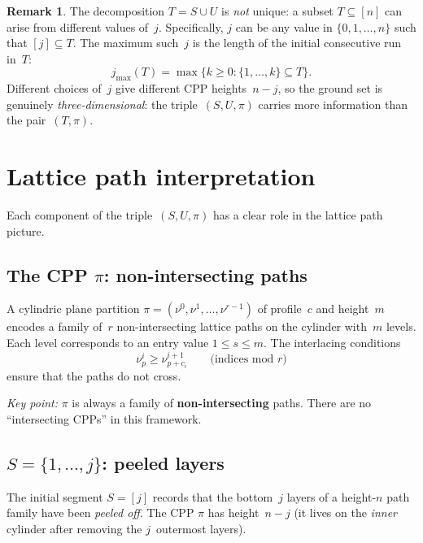 \documentclass[11pt]{article}
\theoremstyle{plain}
\theoremstyle{definition}
\newtheorem{remark}[theorem]{Remark}
\begin{document}
\begin{remark}
The decomposition $T = S \cup U$ is \emph{not} unique: a
subset $T \subseteq [n]$ can arise from different values
of~$j$.  Specifically, $j$ can be any value in
$\{0, 1, \ldots, n\}$ such that $[j] \subseteq T$.  The
maximum such~$j$ is the length of the initial consecutive
run in~$T$:
\[
  j_{\max}(T) = \max\{k \geq 0 : \{1,\ldots,k\} \subseteq T\}.
\]
Different choices of~$j$ give different CPP
heights~$n - j$, so the ground set is genuinely
\emph{three-dimensional}: the triple~$(S, U, \pi)$
carries more information than the pair~$(T, \pi)$.
\end{remark}


\section{Lattice path interpretation}
\label{sec:lattice-paths}

Each component of the triple~$(S, U, \pi)$ has a clear
role in the lattice path picture.

\subsection*{The CPP $\pi$: non-intersecting paths}

A cylindric plane partition $\pi = (\nu^0, \nu^1,
\ldots, \nu^{r-1})$ of profile~$c$ and height~$m$ encodes
a family of~$r$ non-intersecting lattice paths on the
cylinder with~$m$ levels.  Each level corresponds to an
entry value $1 \leq s \leq m$.  The interlacing conditions
\[
  \nu^i_{p} \geq \nu^{i+1}_{p + c_i}
  \qquad \text{(indices mod $r$)}
\]
ensure that the paths do not cross.

\emph{Key point:} $\pi$ is always a family of
\textbf{non-intersecting} paths.  There are no
``intersecting CPPs'' in this framework.

\subsection*{$S = \{1, \ldots, j\}$: peeled layers}

The initial segment $S = [j]$ records that the
bottom~$j$ layers of a height-$n$ path family have been
\emph{peeled off}.  The CPP $\pi$ has height~$n - j$
(it lives on the \emph{inner} cylinder after removing
the $j$~outermost layers).
\end{document}
